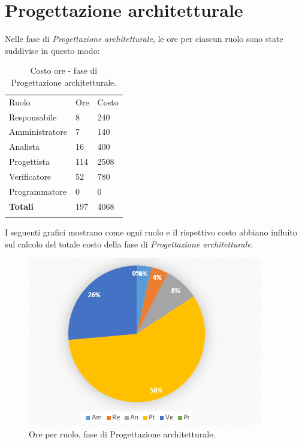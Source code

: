 \documentclass[a4paper]{report}
\begin{document}
		\section{Progettazione architetturale}
			Nelle fase di \emph{Progettazione architetturale}, le ore per ciascun ruolo sono state suddivise in questo modo:
			\begin{table}[H]
				\begin{tabularx}{\textwidth}{Y Y Y}
					Ruolo & Ore & Costo \\
					Responsabile & 8 & 240 \\
					Amministratore & 7 & 140 \\
					Analista & 16 & 400\\
					Progettista & 114 & 2508\\
					Verificatore & 52 & 780\\
					Programmatore & 0 & 0 \\
					\textbf{Totali} & 197 & 4068 \\
				\end{tabularx}
				\caption{Costo ore - fase di Progettazione architetturale. } 
				\label{TCProgettazione}
			\end{table}
			I seguenti grafici mostrano come ogni ruolo e il rispettivo costo abbiano influito sul calcolo del totale 
			costo della fase di \emph{Progettazione architetturale}.
			\begin{figure}[H]
				\centering
				\includegraphics[scale=0.7]{PCProgettazione}
				\caption{Ore per ruolo, fase di Progettazione architetturale.}
			\end{figure}
\end{document}
